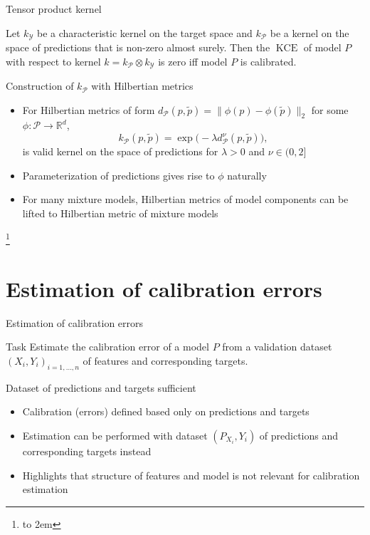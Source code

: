 \documentclass[aspectratio=169,hyperref={pdfpagelabels=false,pageanchor=false,bookmarks=false}]{beamer}
\newcommand{\reffootnote}[1]{%
  \let\oldthefootnote=\thefootnote%
  \addtocounter{footnote}{-1}%
  \renewcommand{\thefootnote}{}%
  \footnote{\hspace{-2em}\hbox to 2em{\hfil\faBook\hspace{0.2em}}\fullcite{#1}}%
  \let\thefootnote=\oldthefootnote%
}
\begin{document}
\begin{frame}{Tensor product kernel}
  \begin{lemma}
    Let $k_{\mathcal{Y}}$ be a characteristic kernel on the target space and $k_{\mathcal{P}}$ be a kernel on the space of predictions that is non-zero almost surely.
    Then the $\operatorname{KCE}$ of model $P$ with respect to kernel $k = k_{\mathcal{P}} \otimes k_{\mathcal{Y}}$ is zero iff model $P$ is calibrated.
  \end{lemma}
  \pause
  \begin{block}{Construction of $k_{\mathcal{P}}$ with Hilbertian metrics}
    \begin{itemize}[<+->]
      \item For Hilbertian metrics of form $d_{\mathcal{P}}(p, \tilde{p}) = \|\phi(p) - \phi(\tilde{p})\|_{2}$
            for some $\phi \colon \mathcal{P} \to \mathbb{R}^{d}$,
            \begin{equation}\label{eq:kp}
              k_{\mathcal{P}}(p, \tilde{p}) = \exp{\big( -\lambda d^{\nu}_{\mathcal{P}}(p, \tilde{p})\big)},
            \end{equation}
            is valid kernel on the space of predictions for $\lambda > 0$ and $\nu \in (0, 2]$
      \item Parameterization of predictions gives rise to $\phi$ naturally
      \item For many mixture models, Hilbertian metrics of model components can be lifted to Hilbertian metric of mixture models
    \end{itemize}
  \end{block}
  \reffootnote{Widmann2021}
\end{frame}

\section{Estimation of calibration errors}
\frame{\sectionpage}

\begin{frame}{Estimation of calibration errors}
  \begin{block}{Task}
    Estimate the calibration error of a model $P$ from a validation dataset
    $(X_{i}, Y_{i})_{i=1,\ldots,n}$ of features and corresponding targets.
  \end{block}
  \pause
  \begin{block}{Dataset of predictions and targets sufficient}
    \begin{itemize}
      \item Calibration (errors) defined based only on predictions and targets
      \item Estimation can be performed with dataset $(P_{X_{i}}, Y_{i})$ of predictions and corresponding targets instead
      \item Highlights that structure of features and model is not relevant for calibration estimation
    \end{itemize}
  \end{block}
\end{frame}
\end{document}

